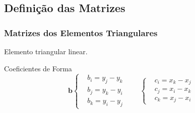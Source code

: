 \documentclass{beamer}
\begin{document}
\subsection{Definição das Matrizes}
\begin{frame}
  \frametitle{Matrizes dos Elementos Triangulares}
  
  \fontsize{7.5}{7.2}\selectfont
  \begin{minipage}{.4\textwidth}
    \centering
     {\raggedleft \tiny Elemento triangular linear.}
  \end{minipage}
  \hfill
  \begin{minipage}{.56\textwidth}
    \begin{block}{Coeficientes de Forma}
      \vspace*{-\baselineskip}\setlength\belowdisplayshortskip{0pt} %
      \centering
      \begin{equation*}
      \mathbf{b} \left\{
	\begin{align*}
	  &b_i = y_j - y_k \\
	  &b_j = y_k - y_i \\
	  &b_k = y_i - y_j
	\end{align*} \right.\qquad
      \mathbf{} \left\{
	\begin{align*}
	  &c_i = x_k - x_j \\
	  &c_j = x_i - x_k \\
	  &c_k = x_j - x_i
	\end{align*} \right.
      \end{equation*}
    \end{block}
    

\end{minipage}
\end{frame}
\end{document}
